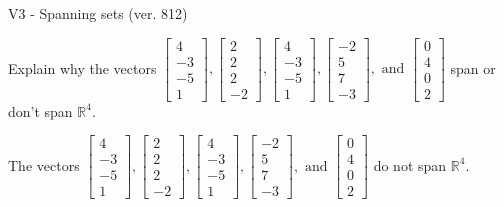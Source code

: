 \begin{exercise}
  \begin{exerciseTitle}V3 - Spanning sets (ver. 812)\end{exerciseTitle}
  \begin{exerciseStatement}
    Explain why the vectors \(\left[\begin{array}{r}
4 \\
-3 \\
-5 \\
1
\end{array}\right] , \left[\begin{array}{r}
2 \\
2 \\
2 \\
-2
\end{array}\right] , \left[\begin{array}{r}
4 \\
-3 \\
-5 \\
1
\end{array}\right] , \left[\begin{array}{r}
-2 \\
5 \\
7 \\
-3
\end{array}\right] , \text{ and } \left[\begin{array}{r}
0 \\
4 \\
0 \\
2
\end{array}\right]\) span or don't span \(\mathbb{R}^4\). 
	


  \end{exerciseStatement}
  \begin{exerciseAnswer}
   The vectors \(\left[\begin{array}{r}
4 \\
-3 \\
-5 \\
1
\end{array}\right] , \left[\begin{array}{r}
2 \\
2 \\
2 \\
-2
\end{array}\right] , \left[\begin{array}{r}
4 \\
-3 \\
-5 \\
1
\end{array}\right] , \left[\begin{array}{r}
-2 \\
5 \\
7 \\
-3
\end{array}\right] , \text{ and } \left[\begin{array}{r}
0 \\
4 \\
0 \\
2
\end{array}\right]\) 
  	 do not  
	span \(\mathbb{R}^4\).
  



\end{exerciseAnswer}
\end{exercise}
